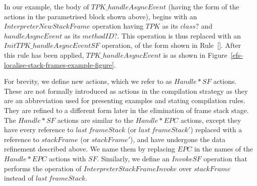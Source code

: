 In our example, the body of $TPK\_handleAsyncEvent$ (having the form
of the actions in the parametrised block shown above), begins with an
$InterpreterNewStackFrame$ operation having $TPK$ as its $class?$ and
$handleAsyncEvent$ as its $methodID?$.
This operation is thus replaced with an $InitTPK\_handleAsyncEventSF$
operation, of the form shown in
Rule~[].
After this rule has been applied, $TPK\_handleAsyncEvent$ is as shown
in Figure~\ref{efs-localise-stack-frames-example-figure}.

For brevity, we define new actions, which we refer to as $Handle*SF$
actions.
These are not formally introduced as actions in the compilation
strategy as they are an abbreviation used for presenting examples and
stating compilation rules.
They are refined to a different form later in the elimination of frame
stack stage.
The $Handle*SF$ actions are similar to the $Handle*EPC$ actions,
except they have every reference to $last~frameStack$ (or
$last~frameStack'$) replaced with a reference to $stackFrame$ (or
$stackFrame'$), and have undergone the data refinement described
above.
We name them by replacing $EPC$ in the names of the $Handle*EPC$
actions with $SF$.
Similarly, we define an $InvokeSF$ operation that performs the
operation of $InterpreterStackFrameInvoke$ over $stackFrame$ instead
of $last~frameStack$.

